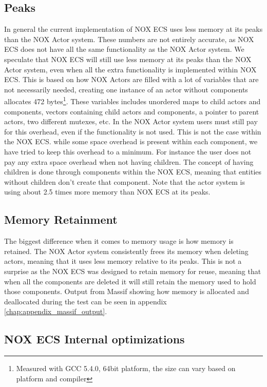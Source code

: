 \subsection{Peaks}
In general the current implementation of NOX ECS uses less memory at its peaks than the NOX Actor system.
These numbers are not entirely accurate, as NOX ECS does not have all the same functionality as the NOX Actor system.
We speculate that NOX ECS will still use less memory at its peaks than the NOX Actor system, even when
all the extra functionality is implemented within NOX ECS.
This is based on how NOX Actors are filled with a lot of variables that are not necessarily needed,
creating one instance of an actor without components allocates 472 bytes\footnote{Measured with GCC 5.4.0, 64bit platform, the size can vary based on platform and compiler}.
These variables includes unordered maps to child actors and components, vectors containing child actors and components,
a pointer to parent actors, two different mutexes, etc.
In the NOX Actor system users must still pay for this overhead, even if the functionality is not used.
This is not the case within the NOX ECS.
while some space overhead is present within each component, we have tried to keep this overhead to a minimum.
For instance the user does not pay any extra space overhead when not having children.
The concept of having children is done through components within the NOX ECS, meaning that entities without children
don't create that component.
Note that the actor system is using about 2.5 times more memory than NOX ECS at its peaks.

\subsection{Memory Retainment}
The biggest difference when it comes to memory usage is how memory is retained.
The NOX Actor system consistently frees its memory when deleting actors, meaning that it uses less memory relative to its peaks.
This is not a surprise as the NOX ECS was designed to retain memory for reuse, meaning that when all the components are deleted
it will still retain the memory used to hold those components.
Output from Massif showing how memory is allocated and deallocated during the test can be seen in appendix \ref{chap:appendix_massif_output}.

\subsection{NOX ECS Internal optimizations}
